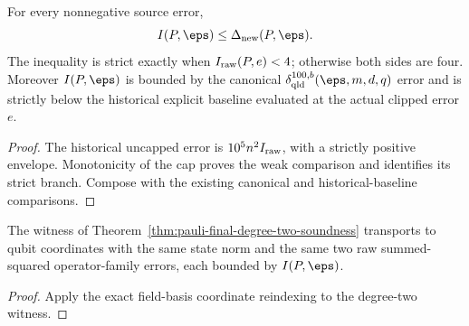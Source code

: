 \begin{theorem}
\label{thm:pauli-final-degree-two-comparison}
\leanok
{}
For every nonnegative source error,
\[
 I(P,\eps)\leq\Delta_{\rm new}(P,\eps).
\]
The inequality is strict exactly when $I_{\rm raw}(P,e)<4$; otherwise both
sides are four.  Moreover $I(P,\eps)$ is bounded by the canonical
$\delta_{\rm qld}^{100,b}(\eps,m,d,q)$ error and is strictly below the
historical explicit baseline evaluated at the actual clipped error $e$.
\end{theorem}
\begin{proof}
\leanok
{}
The historical uncapped error is $10^5n^2I_{\rm raw}$, with a strictly
positive envelope.  Monotonicity of the cap proves the weak comparison and
identifies its strict branch.  Compose with the existing canonical and
historical-baseline comparisons.
\end{proof}

\begin{corollary}
\label{cor:pauli-final-degree-two-qubit}
\leanok
{}
The witness of Theorem~\ref{thm:pauli-final-degree-two-soundness} transports
to qubit coordinates with the same state norm and the same two raw
summed-squared operator-family errors, each bounded by $I(P,\eps)$.
\end{corollary}
\begin{proof}
\leanok
{}
Apply the exact field-basis coordinate reindexing to the degree-two witness.
\end{proof}


